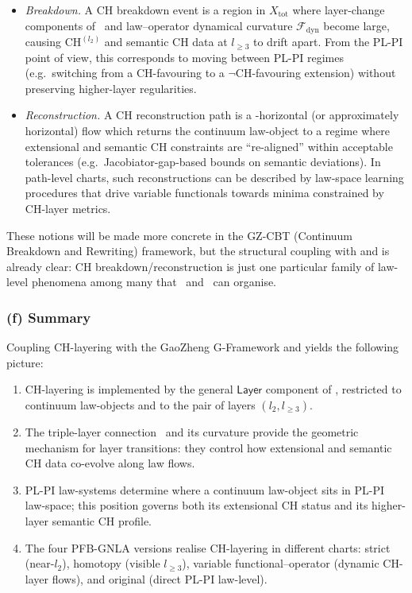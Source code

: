 \documentclass[11pt]{book}
\theoremstyle{plain}
\theoremstyle{definition}
\newcommand{\GFramework}{\text{G-Framework}} \newcommand{\GAlgebra}{\text{G-Algebra}}
\begin{document}
\begin{itemize}
  \item \emph{Breakdown.}
        A CH breakdown event is a region in $X_{\mathrm{tot}}$ where
        layer-change components of \GZLCurv\ and law--operator
        dynamical curvature $\mathcal{F}_{\mathrm{dyn}}$ become large,
        causing $\mathrm{CH}^{(l_2)}$ and semantic CH data at
        $l_{\ge3}$ to drift apart. From the PL-PI point of view, this
        corresponds to moving between PL-PI regimes (e.g.\ switching
        from a CH-favouring to a $\neg\mathrm{CH}$-favouring extension)
        without preserving higher-layer regularities.
  \item \emph{Reconstruction.}
        A CH reconstruction path is a \GZTLC-horizontal (or
        approximately horizontal) flow which returns the continuum
        law-object to a regime where extensional and semantic CH
        constraints are “re-aligned” within acceptable tolerances
        (e.g.\ Jacobiator-gap-based bounds on semantic deviations). In
        path-level charts, such reconstructions can be described by
        law-space learning procedures that drive variable functionals
        towards minima constrained by CH-layer metrics.
\end{itemize}

These notions will be made more concrete in the GZ-CBT (Continuum
Breakdown and Rewriting) framework, but the structural coupling with
\GFramework and \GZGMS is already clear: CH breakdown/reconstruction is
just one particular family of law-level phenomena among many that
\GZTLC\ and \GZLCurv\ can organise.



\subsubsection*{(f) Summary}

Coupling CH-layering with the GaoZheng G-Framework and \GZGMS yields
the following picture:

\begin{enumerate}[label=\arabic*)]
  \item CH-layering is implemented by the general $\mathsf{Layer}$
        component of \GZGMS, restricted to continuum law-objects and
        to the pair of layers $(l_2,l_{\ge3})$.
  \item The triple-layer connection \GZTLC\ and its curvature provide
        the geometric mechanism for layer transitions: they control
        how extensional and semantic CH data co-evolve along law
        flows.
  \item PL-PI law-systems determine where a continuum law-object sits
        in PL-PI law-space; this position governs both its extensional
        CH status and its higher-layer semantic CH profile.
  \item The four PFB-GNLA versions realise CH-layering in different
        charts: strict (near-$l_2$), homotopy (visible $l_{\ge3}$),
        variable functional--operator (dynamic CH-layer flows), and
        original (direct PL-PI law-level).
\end{enumerate}
\end{document}
